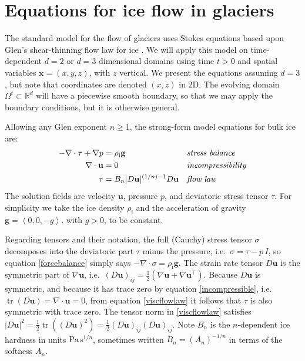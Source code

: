 \documentclass[letterpaper,final,12pt,reqno]{amsart}
\newcommand{\RR}{\mathbb{R}}
\newcommand{\grad}{\nabla}
\newcommand{\Div}{\nabla\cdot}
\newcommand{\trace}{\operatorname{tr}}
\newcommand{\bg}{\mathbf{g}}
\newcommand{\bu}{\mathbf{u}}
\newcommand{\bx}{\mathbf{x}}
\newcommand{\rhoi}{\rho_{\text{i}}}
\begin{document}
\section{Equations for ice flow in glaciers} \label{sec:strongform}

The standard model for the flow of glaciers uses Stokes equations based upon Glen's shear-thinning flow law for ice \cite{GreveBlatter2009,JouvetRappaz2011,SchoofHewitt2013}.  We will apply this model on time-dependent $d=2$ or $d=3$ dimensional domains using time $t>0$ and spatial variables $\bx=(x,y,z)$, with $z$ vertical.  We present the equations assuming $d=3$, but note that coordinates are denoted $(x,z)$ in 2D.  The evolving domain $\Omega^t \subset \RR^d$ will have a piecewise smooth boundary, so that we may apply the boundary conditions, but it is otherwise general.

Allowing any Glen exponent $n\ge 1$, the strong-form model equations for bulk ice are:
\begin{align}
- \nabla \cdot \tau + \nabla p &= \rhoi \bg &&\text{\emph{stress balance}} \label{forcebalance} \\
\nabla \cdot \bu &= 0 &&\text{\emph{incompressibility}} \label{incompressible} \\
\tau &= B_n |D\bu|^{(1/n) - 1} D\bu  &&\text{\emph{flow law}} \label{viscflowlaw}
\end{align}
The solution fields are velocity $\bu$, pressure $p$, and deviatoric stress tensor $\tau$.  For simplicity we take the ice density $\rhoi$ and the acceleration of gravity $\bg=\left<0,0,-g\right>$, with $g>0$, to be constant.

Regarding tensors and their notation, the full (Cauchy) stress tensor $\sigma$ \cite{GreveBlatter2009} decomposes into the deviatoric part $\tau$ minus the pressure, i.e.~$\sigma = \tau - p\,I$, so equation \eqref{forcebalance} simply says $-\Div \sigma = \rhoi \bg$.  The strain rate tensor $D\bu$ is the symmetric part of $\grad \bu$, i.e.~$(D\bu)_{ij} = \frac{1}{2} \left(\grad\bu + \grad\bu^\top\right)$.  Because $D\bu$ is symmetric, and because it has trace zero by equation \eqref{incompressible}, i.e.~$\trace(D\bu)=\nabla \cdot \bu = 0$, from equation \eqref{viscflowlaw} it follows that $\tau$ is also symmetric with trace zero.  The tensor norm in \eqref{viscflowlaw} satisfies $|D\bu|^2 = \frac{1}{2} \trace\left((D\bu)^2\right) = \frac{1}{2} (D\bu)_{ij} (D\bu)_{ij}$.  Note $B_n$ is the $n$-dependent ice hardness in units $\text{Pa}\,\text{s}^{1/n}$, sometimes written $B_n = (A_n)^{-1/n}$ in terms of the softness $A_n$.
\end{document}
